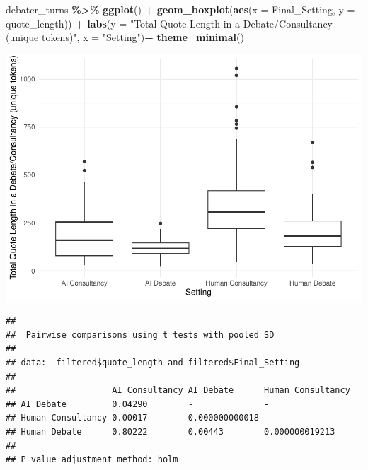 \documentclass[
]{article}
\newenvironment{Shaded}{\begin{snugshade}}{\end{snugshade}}
\newcommand{\AttributeTok}[1]{\textcolor[rgb]{0.13,0.29,0.53}{#1}}
\newcommand{\FunctionTok}[1]{\textcolor[rgb]{0.13,0.29,0.53}{\textbf{#1}}}
\newcommand{\NormalTok}[1]{#1}
\newcommand{\SpecialCharTok}[1]{\textcolor[rgb]{0.81,0.36,0.00}{\textbf{#1}}}
\newcommand{\StringTok}[1]{\textcolor[rgb]{0.31,0.60,0.02}{#1}}
\begin{document}
\begin{Shaded}
\begin{Highlighting}[]
\NormalTok{debater\_turns }\SpecialCharTok{\%\textgreater{}\%}
  \FunctionTok{ggplot}\NormalTok{() }\SpecialCharTok{+}
  \FunctionTok{geom\_boxplot}\NormalTok{(}\FunctionTok{aes}\NormalTok{(}\AttributeTok{x =}\NormalTok{ Final\_Setting, }\AttributeTok{y =}\NormalTok{ quote\_length)) }\SpecialCharTok{+}
  \FunctionTok{labs}\NormalTok{(}\AttributeTok{y =} \StringTok{"Total Quote Length in a Debate/Consultancy (unique tokens)"}\NormalTok{, }\AttributeTok{x =} \StringTok{"Setting"}\NormalTok{)}\SpecialCharTok{+}
  \FunctionTok{theme\_minimal}\NormalTok{()}
\end{Highlighting}
\end{Shaded}

\includegraphics[width=1\linewidth]{debate-2309_files/figure-latex/quote_length graph-4}

\begin{Shaded}
\end{Shaded}

\begin{verbatim}
## 
##  Pairwise comparisons using t tests with pooled SD 
## 
## data:  filtered$quote_length and filtered$Final_Setting 
## 
##                   AI Consultancy AI Debate      Human Consultancy
## AI Debate         0.04290        -              -                
## Human Consultancy 0.00017        0.000000000018 -                
## Human Debate      0.80222        0.00443        0.000000019213   
## 
## P value adjustment method: holm
\end{verbatim}
\end{document}
